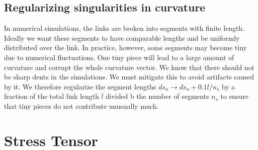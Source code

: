 \documentclass[nofootinbib,preprint,floatfix,titlepage,superscriptaddress]{revtex4} %
\begin{document}
\subsection{Regularizing singularities in curvature}
In numerical simulations, the links are broken into segments with finite length. 
Ideally we want these segments to have comparable lengths and be uniformly distributed over the link. 
In practice, however, some segments may become tiny due to numerical fluctuations. 
One tiny piece will lead to a large amount of curvature and corrupt the whole curvature vector. 
We know that there should not be sharp dents in the simulations. %
We must mitigate this to avoid artifacts caused by it. 
We therefore regularize the segment lengths $ds_n\to ds_n+ 0.1 l/n_s$ by a fraction of the total link length $l$ divided b the number of segments $n_s$ to ensure that tiny pieces do not contribute unusually much. 



\section{Stress Tensor\label{ap:stress}}
\end{document}

